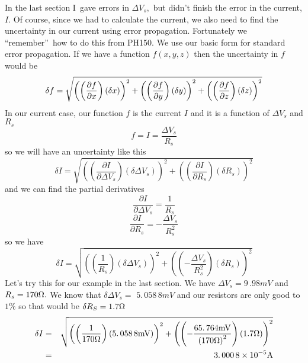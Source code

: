 In the last section I\ gave errors in $\Delta V_{s},$ but didn't finish the
error in the current, $I.$ Of course, since we had to calculate the current,
we also need to find the uncertainty in our current using error propagation.
Fortunately we \textquotedblleft remember\textquotedblright\ how to do this
from PH150. We use our basic form for standard error propagation. If we have
a function $f\left( x,y,z\right) $ then the uncertainty in $f$ would be 
\begin{equation*}
\delta f=\sqrt{\left( \left( \frac{\partial f}{\partial x}\right) \left(
\delta x\right) \right) ^{2}+\left( \left( \frac{\partial f}{\partial y}%
\right) \left( \delta y\right) \right) ^{2}+\left( \left( \frac{\partial f}{%
\partial z}\right) \left( \delta z\right) \right) ^{2}}
\end{equation*}%
In our current case, our function $f$ is the current $I$ and it is a
function of $\Delta V_{s}$ and $R_{s}$ 
\begin{equation*}
f=I=\frac{\Delta V_{s}}{R_{s}}
\end{equation*}%
so we will have an uncertainty like this%
\begin{equation*}
\delta I=\sqrt{\left( \left( \frac{\partial I}{\partial \Delta V_{s}}\right)
\left( \delta \Delta V_{s}\right) \right) ^{2}+\left( \left( \frac{\partial I%
}{\partial R_{s}}\right) \left( \delta R_{s}\right) \right) ^{2}}
\end{equation*}%
and we can find the partial derivatives%
\begin{equation*}
\frac{\partial I}{\partial \Delta V_{s}}=\frac{1}{R_{s}}
\end{equation*}%
\begin{equation*}
\frac{\partial I}{\partial R_{s}}=-\frac{\Delta V_{s}}{R_{s}^{2}}
\end{equation*}%
so we have 
\begin{equation*}
\delta I=\sqrt{\left( \left( \frac{1}{R_{s}}\right) \left( \delta \Delta
V_{s}\right) \right) ^{2}+\left( \left( -\frac{\Delta V_{s}}{R_{s}^{2}}%
\right) \left( \delta R_{s}\right) \right) ^{2}}
\end{equation*}%
Let's try this for our example in the last section. We have $\Delta
V_{s}=9\,.98\unit{mV}$ and $R_{s}=170\unit{%
\Omega%
}.$ We know that $\delta \Delta V_{s}=$ $5.\,\allowbreak 058\,8\unit{mV}$
and our resistors are only good to $1\%$ so that would be $\delta R_{S}=1.7%
\unit{%
\Omega%
}$%
\begin{eqnarray*}
\delta I &=&\sqrt{\left( \left( \frac{1}{170\unit{%
\Omega%
}}\right) \left( 5.\,\allowbreak 058\,8\unit{mV}\right) \right) ^{2}+\left(
\left( -\frac{65.\,\allowbreak 764\unit{mV}}{\left( 170\unit{%
\Omega%
}\right) ^{2}}\right) \left( 1.7\unit{%
\Omega%
}\right) \right) ^{2}} \\
&=&3.\,\allowbreak 000\,8\times 10^{-5}\unit{A}
\end{eqnarray*}

